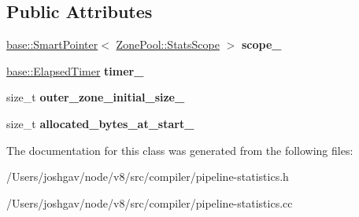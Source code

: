 \subsection*{Public Attributes}
\begin{DoxyCompactItemize}
\item 
\hyperlink{classv8_1_1base_1_1_smart_pointer}{base\+::\+Smart\+Pointer}$<$ \hyperlink{classv8_1_1internal_1_1compiler_1_1_zone_pool_1_1_stats_scope}{Zone\+Pool\+::\+Stats\+Scope} $>$ {\bfseries scope\+\_\+}\hypertarget{classv8_1_1internal_1_1compiler_1_1_pipeline_statistics_1_1_common_stats_a2eb7542c0abe4327ed38f81e6d63cd23}{}\label{classv8_1_1internal_1_1compiler_1_1_pipeline_statistics_1_1_common_stats_a2eb7542c0abe4327ed38f81e6d63cd23}

\item 
\hyperlink{classv8_1_1base_1_1_elapsed_timer}{base\+::\+Elapsed\+Timer} {\bfseries timer\+\_\+}\hypertarget{classv8_1_1internal_1_1compiler_1_1_pipeline_statistics_1_1_common_stats_aa3e9c93e2683fb9ebe1a0367fc6c1e5e}{}\label{classv8_1_1internal_1_1compiler_1_1_pipeline_statistics_1_1_common_stats_aa3e9c93e2683fb9ebe1a0367fc6c1e5e}

\item 
size\+\_\+t {\bfseries outer\+\_\+zone\+\_\+initial\+\_\+size\+\_\+}\hypertarget{classv8_1_1internal_1_1compiler_1_1_pipeline_statistics_1_1_common_stats_a5229353004cee56c86a37a86c373f7d1}{}\label{classv8_1_1internal_1_1compiler_1_1_pipeline_statistics_1_1_common_stats_a5229353004cee56c86a37a86c373f7d1}

\item 
size\+\_\+t {\bfseries allocated\+\_\+bytes\+\_\+at\+\_\+start\+\_\+}\hypertarget{classv8_1_1internal_1_1compiler_1_1_pipeline_statistics_1_1_common_stats_a96005407f17bb14d44364e793f844828}{}\label{classv8_1_1internal_1_1compiler_1_1_pipeline_statistics_1_1_common_stats_a96005407f17bb14d44364e793f844828}

\end{DoxyCompactItemize}


The documentation for this class was generated from the following files\+:\begin{DoxyCompactItemize}
\item 
/\+Users/joshgav/node/v8/src/compiler/pipeline-\/statistics.\+h\item 
/\+Users/joshgav/node/v8/src/compiler/pipeline-\/statistics.\+cc\end{DoxyCompactItemize}
